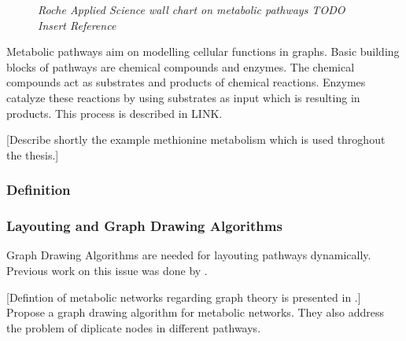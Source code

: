 \begin{figure}[ht]
\centering
{} 
\caption[Roche Applied Science wall chart on metabolic pathways]{\textit{Roche Applied Science wall chart on metabolic pathways TODO Insert Reference}} 
\label{gfx:RocheAppliedScience_MetabolicPathways_WallChart}
\end{figure}

Metabolic pathways aim on modelling cellular functions in graphs. Basic building blocks of pathways are chemical compounds and enzymes. The chemical compounds act as substrates and products of chemical reactions. Enzymes catalyze these reactions by using substrates as input which is resulting in products. This process is described in LINK.

[Describe shortly the example methionine metabolism which is used throghout the thesis.]

\subsubsection{Definition}

\subsubsection{Layouting and Graph Drawing Algorithms}

Graph Drawing Algorithms are needed for layouting pathways dynamically.
Previous work on this issue was done by \citep{Becker2001}.

[Defintion of metabolic networks regarding graph theory is presented in \citep{Bourqui2006}.]
Propose a graph drawing algorithm for metabolic networks\citep{Bourqui2006}. They also address the problem of diplicate nodes
in different pathways.

